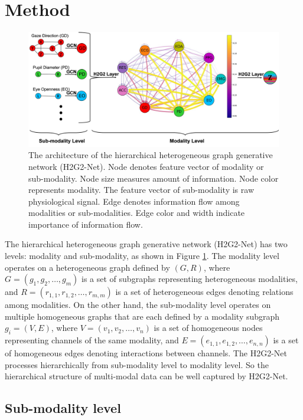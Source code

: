 \documentclass[letterpaper]{article} %
\begin{document}
\section{Method}

\begin{figure}[t]
    \centering
    \includegraphics[width=\columnwidth]{figures/H2G2-Net.jpg}
    \caption{The architecture of the hierarchical heterogeneous graph generative network (H2G2-Net). Node denotes feature vector of modality or sub-modality. Node size measures amount of information. Node color represents modality. The feature vector of sub-modality is raw physiological signal. Edge denotes information flow among modalities or sub-modalities. Edge color and width indicate importance of information flow.}
    \label{fig_H2G2-Net}
\end{figure}

The hierarchical heterogeneous graph generative network (H2G2-Net) has two levels: modality and sub-modality, as shown in Figure \ref{fig_H2G2-Net}. The modality level operates on a heterogeneous graph defined by $(G, R)$, where $G=(g_1, g_2, \dots, g_m)$ is a set of subgraphs representing heterogeneous modalities, and $R=(r_{1,1}, r_{1,2}, \dots, r_{m,m})$ is a set of heterogeneous edges denoting relations among modalities. On the other hand, the sub-modality level operates on multiple homogeneous graphs that are each defined by a modality subgraph $g_i=(V, E)$, where $V=(v_1, v_2, \dots, v_n)$ is a set of homogeneous nodes representing channels of the same modality, and $E=(e_{1,1}, e_{1,2}, \dots, e_{n,n})$ is a set of homogeneous edges denoting interactions between channels. The H2G2-Net processes hierarchically from sub-modality level to modality level. So the hierarchical structure of multi-modal data can be well captured by H2G2-Net.


\subsection{Sub-modality level}
\end{document}
